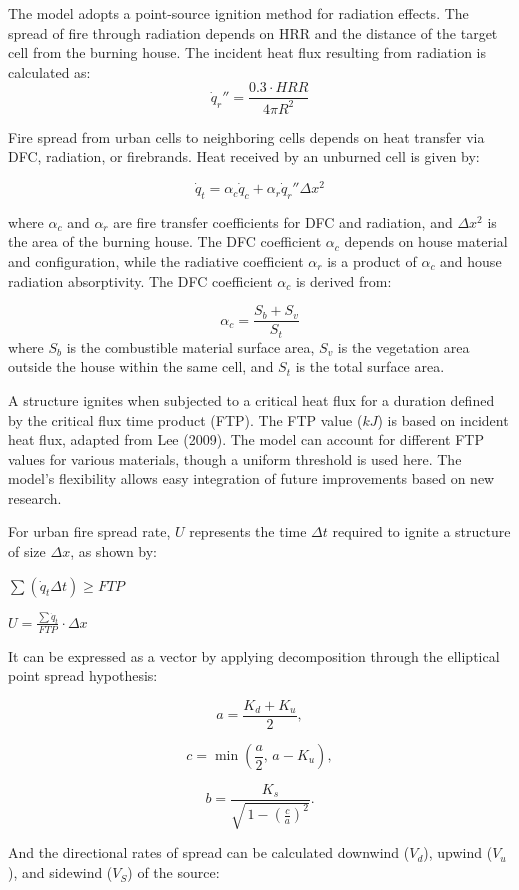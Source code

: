 The model adopts a point-source ignition method for radiation effects. The spread of fire through radiation depends on HRR and the distance of the target cell from the burning house. The incident heat flux resulting from radiation is calculated as:
\[
\dot{q}_r'' = \frac{0.3 \cdot HRR}{4\pi R^2}
\]

Fire spread from urban cells to neighboring cells depends on heat transfer via DFC, radiation, or firebrands. Heat received by an unburned cell is given by:

\[
\dot{q}_t = \alpha_c \dot{q}_c + \alpha_r \dot{q}_r'' \Delta x^2
\]

where $\alpha_c$ and $\alpha_r$ are fire transfer coefficients for DFC and radiation, and $\Delta x^2$ is the area of the burning house. The DFC coefficient $\alpha_c$ depends on house material and configuration, while the radiative coefficient $\alpha_r$ is a product of $\alpha_c$ and house radiation absorptivity. The DFC coefficient $\alpha_c$ is derived from:

\[\alpha_c = \frac{S_b + S_v}{S_t}\]
where $S_b$ is the combustible material surface area, $S_v$ is the vegetation area outside the house within the same cell, and $S_t$ is the total surface area.

A structure ignites when subjected to a critical heat flux for a duration defined by the critical flux time product (FTP). The FTP value ($kJ$) is based on incident heat flux, adapted from Lee (2009). The model can account for different FTP values for various materials, though a uniform threshold is used here. The model’s flexibility allows easy integration of future improvements based on new research.

For urban fire spread rate, $U$ represents the time $\Delta t$ required to ignite a structure of size $\Delta x$, as shown by:

$\sum \left(\dot{q}_t\Delta t\right) \geq FTP$


$U = \frac{\sum \dot{q}_t}{FTP} \cdot \Delta x$

It can be expressed as a vector by applying decomposition through the elliptical point spread hypothesis:


\[
a = \frac{K_d + K_u}{2},
\]

\[
c = \min\!\left( \frac{a}{2},\, a - K_u \right),
\]

\[
b = \frac{K_s}{\sqrt{\,1 - \left(\tfrac{c}{a}\right)^{2}}}.
\]

And the directional rates of spread can be calculated downwind ($V_d$), upwind ($V_u$), and sidewind ($V_S$) of the source:

